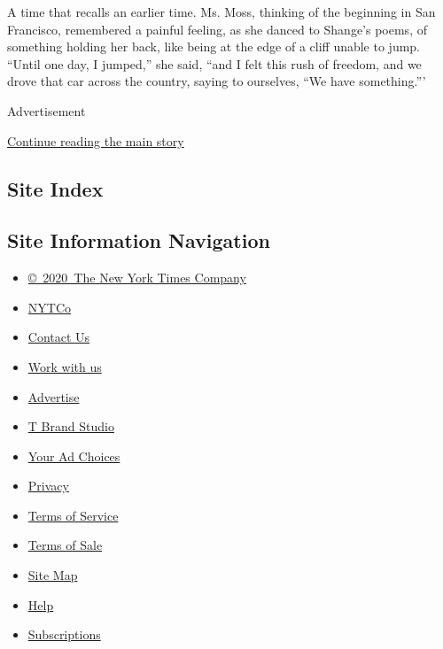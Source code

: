A time that recalls an earlier time. Ms. Moss, thinking of the beginning
in San Francisco, remembered a painful feeling, as she danced to
Shange's poems, of something holding her back, like being at the edge of
a cliff unable to jump. ``Until one day, I jumped,'' she said, ``and I
felt this rush of freedom, and we drove that car across the country,
saying to ourselves, ``We have something.'''

Advertisement

\protect\hyperlink{after-bottom}{Continue reading the main story}

\hypertarget{site-index}{%
\subsection{Site Index}\label{site-index}}

\hypertarget{site-information-navigation}{%
\subsection{Site Information
Navigation}\label{site-information-navigation}}

\begin{itemize}
\tightlist
\item
  \href{https://help.nytimes3xbfgragh.onion/hc/en-us/articles/115014792127-Copyright-notice}{©~2020~The
  New York Times Company}
\end{itemize}

\begin{itemize}
\tightlist
\item
  \href{https://www.nytco.com/}{NYTCo}
\item
  \href{https://help.nytimes3xbfgragh.onion/hc/en-us/articles/115015385887-Contact-Us}{Contact
  Us}
\item
  \href{https://www.nytco.com/careers/}{Work with us}
\item
  \href{https://nytmediakit.com/}{Advertise}
\item
  \href{http://www.tbrandstudio.com/}{T Brand Studio}
\item
  \href{https://www.nytimes3xbfgragh.onion/privacy/cookie-policy\#how-do-i-manage-trackers}{Your
  Ad Choices}
\item
  \href{https://www.nytimes3xbfgragh.onion/privacy}{Privacy}
\item
  \href{https://help.nytimes3xbfgragh.onion/hc/en-us/articles/115014893428-Terms-of-service}{Terms
  of Service}
\item
  \href{https://help.nytimes3xbfgragh.onion/hc/en-us/articles/115014893968-Terms-of-sale}{Terms
  of Sale}
\item
  \href{https://spiderbites.nytimes3xbfgragh.onion}{Site Map}
\item
  \href{https://help.nytimes3xbfgragh.onion/hc/en-us}{Help}
\item
  \href{https://www.nytimes3xbfgragh.onion/subscription?campaignId=37WXW}{Subscriptions}
\end{itemize}
